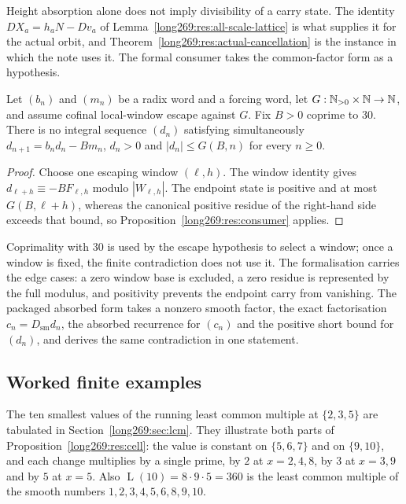 \documentclass[11pt]{article}
\newcommand{\Lprefix}{\operatorname{L}}
\begin{document}
Height absorption alone does not imply divisibility of a carry state.  The
identity $DX_a=h_aN-Dv_a$ of Lemma~\ref{long269:res:all-scale-lattice} is what supplies
it for the actual orbit, and Theorem~\ref{long269:res:actual-cancellation} is the
instance in which the note uses it.  The formal consumer takes the
common-factor form as a hypothesis.

\begin{proposition}
\label{long269:long:windowconsumer}
Let $(b_n)$ and $(m_n)$ be a radix word and a forcing word, let
$G:\mathbb{N}_{>0}\times\mathbb{N}\to\mathbb{N}$, and assume cofinal local-window escape against $G$.
Fix $B>0$ coprime to $30$.  There is no integral sequence $(d_n)$ satisfying
simultaneously $d_{n+1}=b_nd_n-Bm_n$, $d_n>0$ and $|d_n|\le G(B,n)$ for every
$n\ge0$.
\end{proposition}

\begin{proof}
Choose one escaping window $(\ell,h)$.  The window identity gives
$d_{\ell+h}\equiv-BF_{\ell,h}$ modulo $|W_{\ell,h}|$.  The endpoint state is
positive and at most $G(B,\ell+h)$, whereas the canonical positive residue of
the right-hand side exceeds that bound, so Proposition~\ref{long269:res:consumer}
applies.
\end{proof}

Coprimality with $30$ is used by the escape hypothesis to select a window; once
a window is fixed, the finite contradiction does not use it.  The formalisation
carries the edge cases: a zero window base is excluded, a zero residue is
represented by the full modulus, and positivity prevents the endpoint carry
from vanishing.  The packaged absorbed form takes a nonzero smooth factor, the
exact factorisation $c_n=D_{\mathrm{sm}}d_n$, the absorbed recurrence for
$(c_n)$ and the positive short bound for $(d_n)$, and derives the same
contradiction in one statement.

\subsection{Worked finite examples}\label{long269:long:finite-geometry}

The ten smallest values of the running least common multiple at $\{2,3,5\}$ are
tabulated in Section~\ref{long269:sec:lcm}.  They illustrate both parts of
Proposition~\ref{long269:res:cell}: the value is constant on $\{5,6,7\}$ and on
$\{9,10\}$, and each change multiplies by a single prime, by $2$ at
$x=2,4,8$, by $3$ at $x=3,9$ and by $5$ at $x=5$.  Also $\Lprefix(10)=8\cdot9\cdot5=360$
is the least common multiple of the smooth numbers $1,2,3,4,5,6,8,9,10$.
\end{document}

